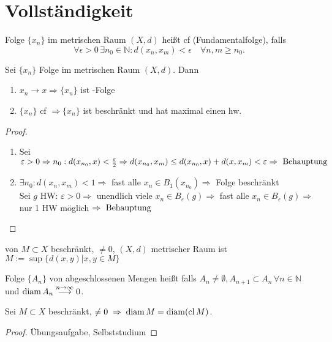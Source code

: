 \section{Vollständigkeit}
\begin{*definition}
	Folge $\{x_n\}$ im metrischen Raum $(X,d)$ heißt \gls{cf} (Fundamentalfolge), falls
    \[
    \forall\epsilon > 0 \,\exists n_0\in\mathbb{N}: d(x_n, x_m) < \epsilon\quad\forall n,m\ge n_0.
    \]
\end{*definition}

\begin{proposition}
	Sei $\{x_n\}$ Folge im metrischen Raum $(X,d)$. Dann
	\begin{enumerate}[label={\arabic*)}]
		\item $x_n\rightarrow x \Rightarrow \{x_n\}$ ist -Folge
		\item $\{x_n\}$ \gls{cf} $\Rightarrow \{x_n\}$ ist beschränkt und hat maximal einen \gls{hw}.
	\end{enumerate}
\end{proposition}
\begin{proof}
	\begin{enumerate}
		\item Sei $\varepsilon>0\Rightarrow n_0:d(x_{n_0},x)<\frac{\varepsilon}{2}\Rightarrow d(x_{n_0},x_m)\le d(x_{n_0},x)+d(x,x_m)<\varepsilon\Rightarrow \text{ Behauptung}$
		\item $\exists n_0:d(x_n,x_m)<1\Rightarrow$ fast alle $x_n\in B_1(x_{n_0})\Rightarrow$ Folge beschränkt \\
		Sei $g$ HW: $\varepsilon>0\Rightarrow$ unendlich viele $x_n\in B_{\varepsilon}(g)\Rightarrow$ fast alle $x_n\in B_{\varepsilon}(g)\Rightarrow$ nur 1 HW möglich $\Rightarrow \text{ Behauptung}$
	\end{enumerate}
\end{proof}

\begin{*definition}[Durchmesser]
	 von $M\subset X$ beschränkt, $\neq 0$, $(X,d)$ metrischer Raum ist $M:=\sup\{d(x,y) | x,y\in M\}$
	
	Folge $\{A_n\}$ von abgeschlossenen Mengen heißt  falls $A_n\neq\emptyset, A_{n+1}\subset A_n\,\forall n\in\mathbb{N}$ und $\operatorname{diam} A_n\overset{n\rightarrow\infty}{\longrightarrow}0$.
\end{*definition}

\begin{lemma}
	Sei $M\subset X$ beschränkt, $\neq 0\;\Rightarrow\;\operatorname{diam} M = \operatorname{diam} (\operatorname{cl} M)$.
\end{lemma}
\begin{proof}
	Übungsaufgabe, Selbststudium
\end{proof}

